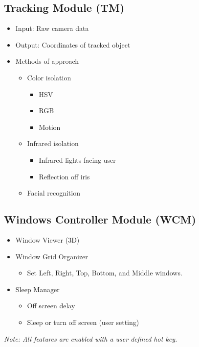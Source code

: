 \documentclass[12pt]{article}
\begin{document}
\subsection{Tracking Module (TM)}
\begin{itemize}
	\item Input: Raw camera data
	\item Output: Coordinates of tracked object
	\item Methods of approach
	\begin{itemize}
		\item{Color isolation}
		\begin{itemize}
			\item{HSV}
			\item{RGB}
			\item{Motion}
		\end{itemize}
	\end{itemize}
	\begin{itemize}
		\item{Infrared isolation}
		\begin{itemize}
			\item Infrared lights facing user
			\item Reflection off iris
		\end{itemize}
		\item{Facial recognition}
	\end{itemize}
\end{itemize}	

\subsection{Windows Controller Module (WCM)}
\begin{itemize}
	\item{Window Viewer (3D)}
	\item{Window Grid Organizer}
	\begin{itemize}
		\item{Set Left, Right, Top, Bottom, and Middle windows.}
	\end{itemize}
	\item{Sleep Manager}
	\begin{itemize}
		\item{Off screen delay}
		\item{Sleep or turn off screen (user setting)}
	\end{itemize}
\end{itemize}
\textit{Note: All features are enabled with a user defined hot key.}
\end{document}
